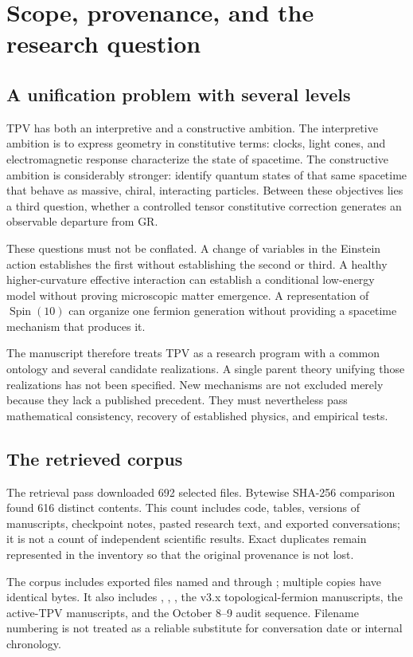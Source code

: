 \documentclass[11pt,oneside]{report}
\newcommand{\Spin}{\operatorname{Spin}}
\begin{document}
\chapter{Scope, provenance, and the research question}
\section{A unification problem with several levels}
TPV has both an interpretive and a constructive ambition. The interpretive ambition is to express geometry in constitutive terms: clocks, light cones, and electromagnetic response characterize the state of spacetime. The constructive ambition is considerably stronger: identify quantum states of that same spacetime that behave as massive, chiral, interacting particles. Between these objectives lies a third question, whether a controlled tensor constitutive correction generates an observable departure from GR.

These questions must not be conflated. A change of variables in the Einstein action establishes the first without establishing the second or third. A healthy higher-curvature effective interaction can establish a conditional low-energy model without proving microscopic matter emergence. A representation of $\Spin(10)$ can organize one fermion generation without providing a spacetime mechanism that produces it.

The manuscript therefore treats TPV as a research program with a common ontology and several candidate realizations. A single parent theory unifying those realizations has not been specified. New mechanisms are not excluded merely because they lack a published precedent. They must nevertheless pass mathematical consistency, recovery of established physics, and empirical tests.

\section{The retrieved corpus}
The retrieval pass downloaded 692 selected files. Bytewise SHA-256 comparison found 616 distinct contents. This count includes code, tables, versions of manuscripts, checkpoint notes, pasted research text, and exported conversations; it is not a count of independent scientific results. Exact duplicates remain represented in the inventory so that the original provenance is not lost.

The corpus includes exported files named  and  through ; multiple copies have identical bytes. It also includes , , , the v3.x topological-fermion manuscripts, the active-TPV manuscripts, and the October 8--9 audit sequence. Filename numbering is not treated as a reliable substitute for conversation date or internal chronology.
\end{document}
